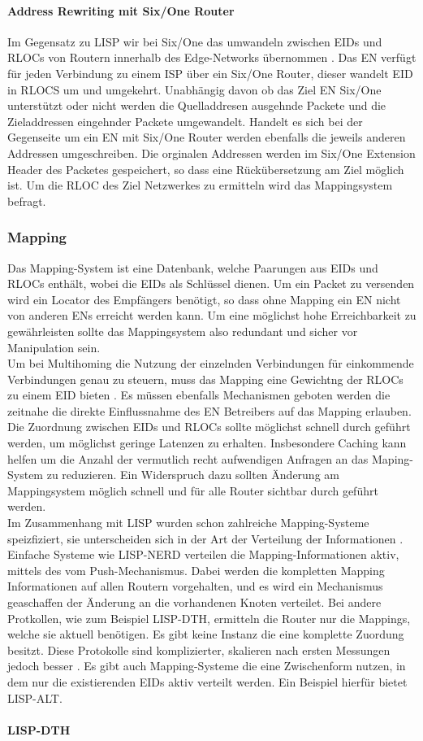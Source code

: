 \paragraph{Address Rewriting mit Six/One Router}
Im Gegensatz zu LISP wir bei Six/One das umwandeln zwischen EIDs und RLOCs von Routern innerhalb des Edge-Networks übernommen \cite{vogt:2008:six}. Das EN verfügt für jeden Verbindung zu einem ISP über ein Six/One Router, dieser wandelt EID in RLOCS um und umgekehrt. Unabhängig davon ob das Ziel EN Six/One unterstützt oder nicht werden die Quelladdresen ausgehnde Packete und die Zieladdressen eingehnder Packete umgewandelt. Handelt es sich bei der Gegenseite um ein EN mit Six/One Router werden ebenfalls die jeweils anderen Addressen umgeschreiben. Die orginalen Addressen werden im Six/One Extension Header des Packetes gespeichert, so dass eine Rückübersetzung am Ziel möglich ist. Um die RLOC des Ziel Netzwerkes zu ermitteln wird das Mappingsystem befragt.

\subsubsection{Mapping}
Das Mapping-System ist eine Datenbank, welche Paarungen aus EIDs und RLOCs enthält, wobei die EIDs als Schlüssel dienen. Um ein Packet zu versenden wird ein Locator des Empfängers benötigt, so dass ohne Mapping ein EN nicht von anderen ENs erreicht werden kann. Um eine möglichst hohe Erreichbarkeit zu gewährleisten sollte das Mappingsystem also redundant und sicher vor Manipulation sein. \\
Um bei Multihoming die Nutzung der einzelnden Verbindungen für einkommende Verbindungen genau zu steuern, muss das Mapping eine Gewichtng der RLOCs zu einem EID bieten \cite{mathy:2008:dht}. Es müssen ebenfalls Mechanismen geboten werden die zeitnahe die direkte Einflussnahme des EN Betreibers auf das Mapping erlauben. \\
Die Zuordnung zwischen EIDs und RLOCs sollte möglichst schnell durch geführt werden, um möglichst geringe Latenzen zu erhalten. Insbesondere Caching kann helfen um die Anzahl der vermutlich recht aufwendigen Anfragen an das Maping-System zu reduzieren. Ein Widerspruch dazu sollten Änderung am Mappingsystem möglich schnell und für alle Router sichtbar durch geführt werden. \\
Im Zusammenhang mit LISP wurden schon zahlreiche Mapping-Systeme speizfiziert, sie unterscheiden sich in der Art der Verteilung der Informationen \cite{mathy:2008:dht}. Einfache Systeme wie LISP-NERD verteilen die Mapping-Informationen aktiv, mittels des vom Push-Mechanismus. Dabei werden die kompletten Mapping Informationen auf allen Routern vorgehalten, und es wird ein Mechanismus geaschaffen der Änderung an die vorhandenen Knoten verteilet. Bei andere Protkollen, wie zum Beispiel LISP-DTH, ermitteln die Router nur die Mappings, welche sie aktuell benötigen. Es gibt keine Instanz die eine komplette Zuordung besitzt. Diese Protokolle sind komplizierter, skalieren nach ersten Messungen jedoch besser \cite{iannone:2007:cost}. Es gibt auch Mapping-Systeme die eine Zwischenform nutzen, in dem nur die existierenden EIDs aktiv verteilt werden. Ein Beispiel hierfür bietet LISP-ALT.

\paragraph{LISP-DTH}




